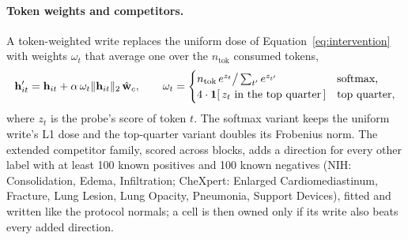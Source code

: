 \documentclass{article}
\begin{document}
\paragraph{Token weights and competitors.} A token-weighted write replaces the uniform dose of Equation~\ref{eq:intervention} with weights $\omega_t$ that average one over the $n_{\mathrm{tok}}$ consumed tokens,
\begin{equation}
\mathbf{h}'_{it}=\mathbf{h}_{it}+\alpha\,\omega_t\lVert\mathbf{h}_{it}\rVert_2\,\hat{\mathbf{w}}_c,\qquad
\omega_t=\begin{cases}n_{\mathrm{tok}}\,e^{z_t}\big/\sum_{t'}e^{z_{t'}} & \text{softmax,}\\ 4\cdot\mathbf 1[\,z_t\text{ in the top quarter}\,] & \text{top quarter,}\end{cases}
\label{eq:token-weights}
\end{equation}
where $z_t$ is the probe's score of token $t$. The softmax variant keeps the uniform write's L1 dose and the top-quarter variant doubles its Frobenius norm. The extended competitor family, scored across \cfExtcompBlocks{} blocks, adds a direction for every other label with at least 100 known positives and 100 known negatives (NIH: Consolidation, Edema, Infiltration; CheXpert: Enlarged Cardiomediastinum, Fracture, Lung Lesion, Lung Opacity, Pneumonia, Support Devices), fitted and written like the protocol normals; a cell is then owned only if its write also beats every added direction.
\end{document}
